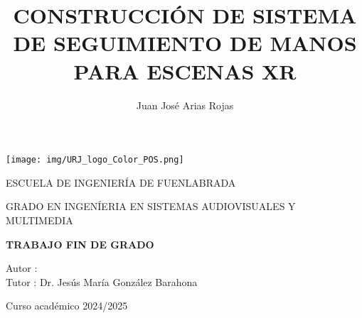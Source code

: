 \documentclass[a4paper, 12pt]{book}
\title{CONSTRUCCIÓN DE SISTEMA DE SEGUIMIENTO DE MANOS PARA ESCENAS XR}
\author{Juan José Arias Rojas}
\makeatletter
\let\thetitle\@title
\let\theauthor\@author
\makeatother
\begin{document}
\renewcommand{\refname}{Bibliografía}  %
\renewcommand{\appendixname}{Apéndice}



\begin{titlepage}
	\begin{center}
		\texttt{[image: img/URJ\_logo\_Color\_POS.png]}

		\vspace{1.75cm}

		\LARGE
		ESCUELA DE INGENIERÍA DE FUENLABRADA
		\vspace{1cm}

		\LARGE
		GRADO EN INGENÍERIA EN SISTEMAS AUDIOVISUALES Y MULTIMEDIA

		\vspace{1cm}
		\LARGE
		\textbf{TRABAJO FIN DE GRADO}

		\vspace{2cm}

		\Large
		\MakeUppercase{\thetitle}

		\vspace{2cm}

		\large
		Autor : \theauthor \\
		Tutor : Dr. Jesús María González Barahona\\
		\vspace{1cm}

		\large
		Curso académico 2024/2025

	\end{center}
\end{titlepage}

\newpage
\mbox{}
\thispagestyle{empty} %



\clearpage
{}
\chapter*{}

\vspace{12cm}
\end{document}
